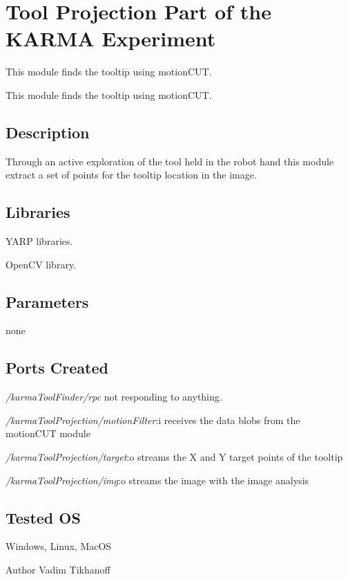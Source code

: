 \section{Tool Projection Part of the K\+A\+R\+MA Experiment}
\label{group__karmaToolProjection}


This module finds the tooltip using motion\+C\+UT.  


This module finds the tooltip using motion\+C\+UT. 

\hypertarget{group__karmaToolProjection_intro_sec}{}\subsection{Description}\label{group__karmaToolProjection_intro_sec}
Through an active exploration of the tool held in the robot hand this module extract a set of points for the tooltip location in the image.\hypertarget{group__karmaToolProjection_lib_sec}{}\subsection{Libraries}\label{group__karmaToolProjection_lib_sec}

\begin{DoxyItemize}
\item Y\+A\+RP libraries.
\item Open\+CV library.
\end{DoxyItemize}\hypertarget{group__karmaToolProjection_parameters_sec}{}\subsection{Parameters}\label{group__karmaToolProjection_parameters_sec}
none\hypertarget{group__karmaToolProjection_portsc_sec}{}\subsection{Ports Created}\label{group__karmaToolProjection_portsc_sec}

\begin{DoxyItemize}
\item {\itshape /karma\+Tool\+Finder/rpc} not responding to anything.
\item {\itshape /karma\+Tool\+Projection/motion\+Filter}\+:i receives the data blobs from the motion\+C\+UT module
\item {\itshape /karma\+Tool\+Projection/target}\+:o streams the X and Y target points of the tooltip
\item {\itshape /karma\+Tool\+Projection/img}\+:o streams the image with the image analysis
\end{DoxyItemize}\hypertarget{group__karmaToolProjection_tested_os_sec}{}\subsection{Tested OS}\label{group__karmaToolProjection_tested_os_sec}
Windows, Linux, Mac\+OS

\begin{DoxyAuthor}{Author}
Vadim Tikhanoff 
\end{DoxyAuthor}
